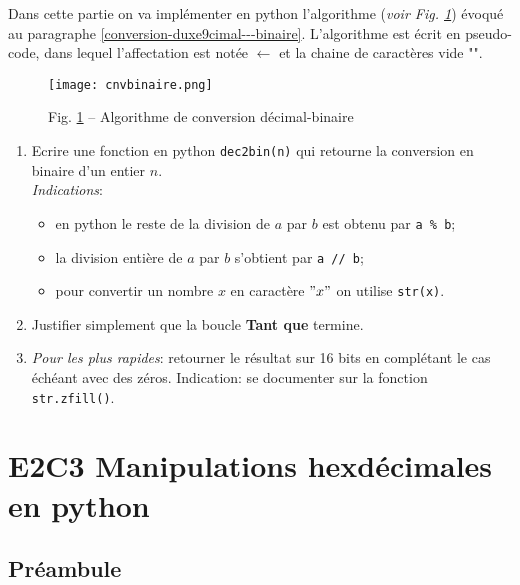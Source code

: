 \documentclass[11pt, french]{article}
\makeatletter
\def\maxwidth{\ifdim\Gin@nat@width>\linewidth\linewidth
    \else\Gin@nat@width\fi}
\let\Oldincludegraphics\includegraphics
\renewcommand{\includegraphics}[1]{\Oldincludegraphics[width=.8\maxwidth]{#1}}
\makeatother
\begin{document}
Dans cette partie on va implémenter en python l'algorithme (\textit{voir Fig. \ref{fig:cnvbinaire}}) évoqué au
paragraphe  \ref{conversion-duxe9cimal---binaire}. L'algorithme est écrit en
pseudo-code, dans lequel l'affectation est notée \(\leftarrow\) et la
chaine de caractères vide "".
\begin{figure}[h]
	\begin{center}
		 \texttt{[image: cnvbinaire.png]} 
	\end{center}
	\caption{Fig. \ref{fig:cnvbinaire} -- Algorithme de conversion décimal-binaire}
	\label{fig:cnvbinaire}
\end{figure}

 \begin{enumerate}
 \item Ecrire une fonction en python \texttt{dec2bin(n)} qui retourne la conversion en
binaire d'un entier \(n\).\\
\emph{Indications}: 
	\begin{itemize}
\item en python le reste de la division de \(a\) par \(b\) est obtenu par \texttt{a\ \%\ b}; 
\item la division entière de \(a\) par \(b\) s'obtient par \texttt{a\ //\ b}; 
\item pour convertir un nombre \(x\) en caractère \("x"\) on utilise \texttt{str(x)}.
	\end{itemize}
\item Justifier simplement que la boucle \textbf{Tant que} termine. 
\item \emph{Pour les plus rapides}: retourner le résultat sur 16 bits en complétant le
cas échéant avec des zéros. Indication: se documenter sur la fonction \texttt{str.zfill()}.
\end{enumerate}
    \hypertarget{e2c3-manipulations-hexduxe9cimales-en-python}{%
\section{E2C3 Manipulations hexdécimales en
python}\label{e2c3-manipulations-hexduxe9cimales-en-python}}

\hypertarget{pruxe9ambule}{%
\subsection{Préambule}\label{pruxe9ambule}}
\end{document}
